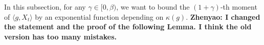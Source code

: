 \documentclass[12pt, a4paper]{amsart}
\newtheorem{lem}[thm]{Lemma}
\theoremstyle{definition}
\numberwithin{equation}{section}
\begin{document}
 In this subsection, for any $\gamma \in [0,\beta)$, we want to bound the $(1+\gamma)$-th moment of $\langle g ,X_t \rangle $ by an exponential function depending on $\kappa(g)$.
    {\bf Zhenyao: I changed the statement and the proof of the following Lemma. I think the old version has too many mistakes.}
\begin{comment}
\begin{lem}\label{lem: lemma23}
For any $0\leq \gamma < \beta$ there exists a constant $C_2>0$ such that
$$\|M_k^t[g]\|_{1+\gamma}\leq C_2 e^{\frac{\alpha}{1+\gamma}t}e^{\frac{\gamma \alpha-\kappa(g)(1+\gamma)b}{1+\gamma}k},$$
for any $k \in \{0,...,t\}$.
\end{lem}
\begin{proof}
    Let $C(k)=e^{(\alpha-\kappa(g)b)k}$.
    Define events $A:=\{|M_t^k[g]|>C(k)\}$ and $A_{k,\mu}:=\{|\langle T_k^{\alpha}g, X_1\rangle-\langle T_{k+1}^{\alpha}g,\mu\rangle|>C(k)\}$ for each $k \in \mathbb N$ and $\mu \in \mathcal M(\mathbb R^d)$ with compact support.
    Notice that
\[
    \mathbb{P}_{\mu}[|M_k^t[g]|^{1+\gamma}]
    =\mathbb{P}_{\mu}[|M_k^t[g]\mathbf{1}_{A^c}|^{1+\gamma}]+\mathbb{P}_{\mu}[|M_k^t[g]\mathbf{1}_{A}|^{1+\gamma}]
    =:I+II.
\]
    For the first part,
\begin{align*}
    I\leq C(k)^{1+\gamma}
    =e^{(\alpha-\kappa(g)b)k(1+\gamma)}
    \leq e^{\alpha t}e^{(\gamma \alpha-\kappa(g)(1+\gamma)b)k},
\end{align*}
    since $k\leq t$.


\end{comment}
\end{document}
